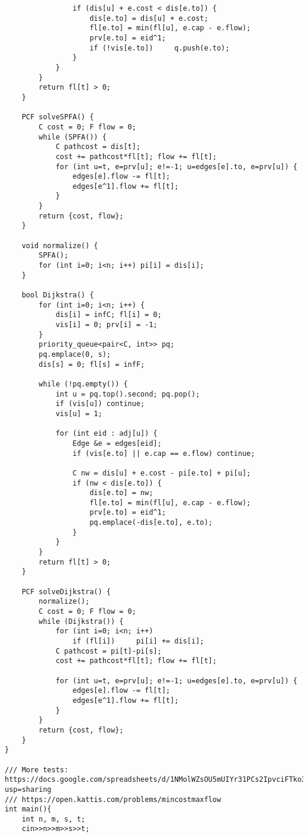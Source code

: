 \documentclass[FSZ,a4paper,onesided]{article}
\begin{document}
\begin{multicols*}{\COLS}
\begin{lstlisting}
                if (dis[u] + e.cost < dis[e.to]) {
                    dis[e.to] = dis[u] + e.cost;
                    fl[e.to] = min(fl[u], e.cap - e.flow);
                    prv[e.to] = eid^1;
                    if (!vis[e.to])     q.push(e.to);
                }
            }
        }
        return fl[t] > 0;
    }

    PCF solveSPFA() {
        C cost = 0; F flow = 0;
        while (SPFA()) {
            C pathcost = dis[t];
            cost += pathcost*fl[t]; flow += fl[t];
            for (int u=t, e=prv[u]; e!=-1; u=edges[e].to, e=prv[u]) {
                edges[e].flow -= fl[t];
                edges[e^1].flow += fl[t];
            }
        }
        return {cost, flow};
    }

    void normalize() {
        SPFA();
        for (int i=0; i<n; i++) pi[i] = dis[i];
    }

    bool Dijkstra() {
        for (int i=0; i<n; i++) {
            dis[i] = infC; fl[i] = 0;
            vis[i] = 0; prv[i] = -1;
        }
        priority_queue<pair<C, int>> pq;
        pq.emplace(0, s);
        dis[s] = 0; fl[s] = infF;

        while (!pq.empty()) {
            int u = pq.top().second; pq.pop();
            if (vis[u]) continue;
            vis[u] = 1;

            for (int eid : adj[u]) {
                Edge &e = edges[eid];
                if (vis[e.to] || e.cap == e.flow) continue;

                C nw = dis[u] + e.cost - pi[e.to] + pi[u];
                if (nw < dis[e.to]) {
                    dis[e.to] = nw;
                    fl[e.to] = min(fl[u], e.cap - e.flow);
                    prv[e.to] = eid^1;
                    pq.emplace(-dis[e.to], e.to);
                }
            }
        }
        return fl[t] > 0;
    }

    PCF solveDijkstra() {
        normalize();
        C cost = 0; F flow = 0;
        while (Dijkstra()) {
            for (int i=0; i<n; i++)
                if (fl[i])     pi[i] += dis[i];
            C pathcost = pi[t]-pi[s];
            cost += pathcost*fl[t]; flow += fl[t];

            for (int u=t, e=prv[u]; e!=-1; u=edges[e].to, e=prv[u]) {
                edges[e].flow -= fl[t];
                edges[e^1].flow += fl[t];
            }
        }
        return {cost, flow};
    }
}

/// More tests: https://docs.google.com/spreadsheets/d/1NMolWZsOU5mUIYr31PCs2IpvciFTko3vmrydzutpWhg/edit?usp=sharing
/// https://open.kattis.com/problems/mincostmaxflow
int main(){
    int n, m, s, t;
    cin>>n>>m>>s>>t;


\end{lstlisting}
\end{multicols*}
\end{document}
